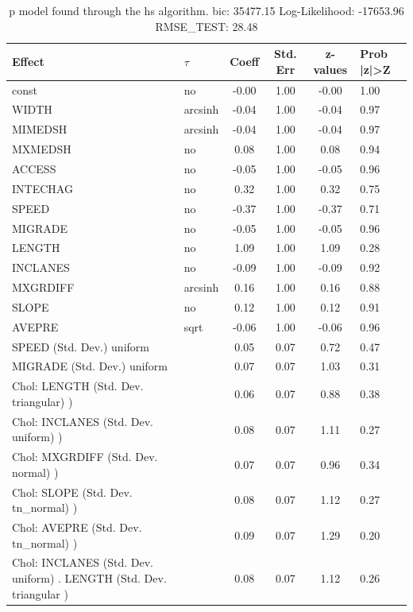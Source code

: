 \begin{table}
	\caption{p model found through the hs algorithm. bic: 35477.15 Log-Likelihood: -17653.96 RMSE_TEST: 28.48}
	\begin{center}
		\begin{tabular}{|l|l|c|c|c|l|}
			\hline
			Effect & $\tau$ & Coeff & Std. Err & z-values & Prob |z|>Z \\
			\hline
			const & no & -0.00 & 1.00 & -0.00 & 1.00 \\
			\hline
			WIDTH & arcsinh & -0.04 & 1.00 & -0.04 & 0.97 \\
			\hline
			MIMEDSH & arcsinh & -0.04 & 1.00 & -0.04 & 0.97 \\
			\hline
			MXMEDSH & no & 0.08 & 1.00 & 0.08 & 0.94 \\
			\hline
			ACCESS & no & -0.05 & 1.00 & -0.05 & 0.96 \\
			\hline
			INTECHAG & no & 0.32 & 1.00 & 0.32 & 0.75 \\
			\hline
			SPEED & no & -0.37 & 1.00 & -0.37 & 0.71 \\
			\hline
			MIGRADE & no & -0.05 & 1.00 & -0.05 & 0.96 \\
			\hline
			LENGTH & no & 1.09 & 1.00 & 1.09 & 0.28 \\
			\hline
			INCLANES & no & -0.09 & 1.00 & -0.09 & 0.92 \\
			\hline
			MXGRDIFF & arcsinh & 0.16 & 1.00 & 0.16 & 0.88 \\
			\hline
			SLOPE & no & 0.12 & 1.00 & 0.12 & 0.91 \\
			\hline
			AVEPRE & sqrt & -0.06 & 1.00 & -0.06 & 0.96 \\
			\hline
			SPEED (Std. Dev.) uniform &  & 0.05 & 0.07 & 0.72 & 0.47 \\
			\hline
			MIGRADE (Std. Dev.) uniform &  & 0.07 & 0.07 & 1.03 & 0.31 \\
			\hline
			 Chol: LENGTH (Std. Dev. triangular) ) &  & 0.06 & 0.07 & 0.88 & 0.38 \\
			\hline
			 Chol: INCLANES (Std. Dev. uniform) ) &  & 0.08 & 0.07 & 1.11 & 0.27 \\
			\hline
			 Chol: MXGRDIFF (Std. Dev. normal) ) &  & 0.07 & 0.07 & 0.96 & 0.34 \\
			\hline
			 Chol: SLOPE (Std. Dev. tn_normal) ) &  & 0.08 & 0.07 & 1.12 & 0.27 \\
			\hline
			 Chol: AVEPRE (Std. Dev. tn_normal) ) &  & 0.09 & 0.07 & 1.29 & 0.20 \\
			\hline
			 Chol: INCLANES (Std. Dev. uniform) . LENGTH (Std. Dev.   triangular ) &  & 0.08 & 0.07 & 1.12 & 0.26 \\

\end{tabular}
\end{center}
\end{table}

